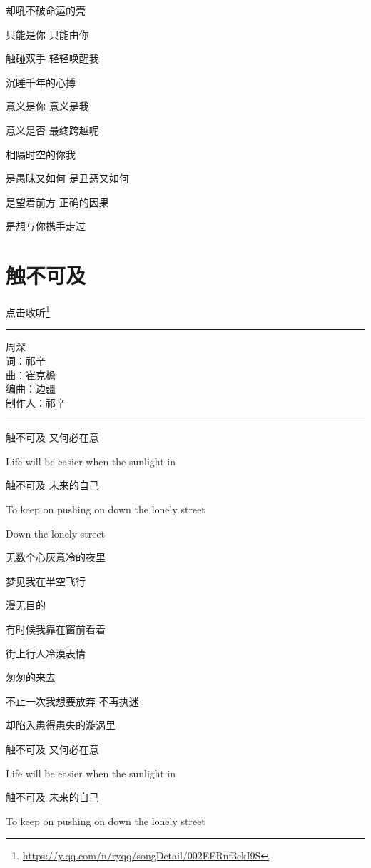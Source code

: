 \documentclass[]{ctexbook}
\renewcommand{\href}[2]{#2\footnote{\url{#1}}}
\begin{document}
却吼不破命运的壳

只能是你 只能由你

触碰双手 轻轻唤醒我

沉睡千年的心搏

意义是你 意义是我

意义是否 最终跨越呢

相隔时空的你我

是愚昧又如何 是丑恶又如何

是望着前方 正确的因果

是想与你携手走过

\section*{触不可及}\label{untouchable}


\href{https://y.qq.com/n/ryqq/songDetail/002EFRnf3ekI9S}{点击收听}

\begin{center}\rule{0.5\linewidth}{0.5pt}\end{center}

周深\\
词：祁辛\\
曲：崔克檐\\
编曲：边疆\\
制作人：祁辛

\begin{center}\rule{0.5\linewidth}{0.5pt}\end{center}

触不可及 又何必在意

Life will be easier when the sunlight in

触不可及 未来的自己

To keep on pushing on down the lonely street

Down the lonely street

无数个心灰意冷的夜里

梦见我在半空飞行

漫无目的

有时候我靠在窗前看着

街上行人冷漠表情

匆匆的来去

不止一次我想要放弃 不再执迷

却陷入患得患失的漩涡里

触不可及 又何必在意

Life will be easier when the sunlight in

触不可及 未来的自己

To keep on pushing on down the lonely street
\end{document}
